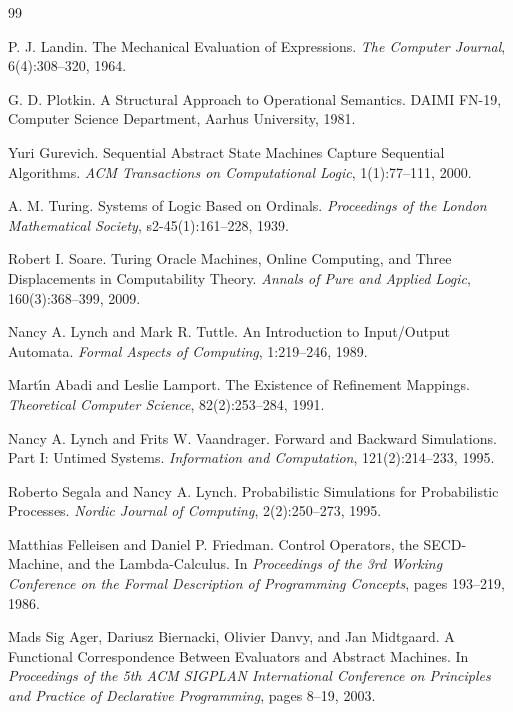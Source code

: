 \documentclass[11pt]{article}
\begin{document}
\begin{thebibliography}{99}


P. J. Landin.
\newblock The Mechanical Evaluation of Expressions.
\newblock \emph{The Computer Journal}, 6(4):308--320, 1964.

G. D. Plotkin.
\newblock A Structural Approach to Operational Semantics.
\newblock DAIMI FN-19, Computer Science Department, Aarhus University, 1981.

Yuri Gurevich.
\newblock Sequential Abstract State Machines Capture Sequential Algorithms.
\newblock \emph{ACM Transactions on Computational Logic}, 1(1):77--111, 2000.

A. M. Turing.
\newblock Systems of Logic Based on Ordinals.
\newblock \emph{Proceedings of the London Mathematical Society}, s2-45(1):161--228, 1939.

Robert I. Soare.
\newblock Turing Oracle Machines, Online Computing, and Three Displacements in Computability Theory.
\newblock \emph{Annals of Pure and Applied Logic}, 160(3):368--399, 2009.

Nancy A. Lynch and Mark R. Tuttle.
\newblock An Introduction to Input/Output Automata.
\newblock \emph{Formal Aspects of Computing}, 1:219--246, 1989.

Mart\'\i n Abadi and Leslie Lamport.
\newblock The Existence of Refinement Mappings.
\newblock \emph{Theoretical Computer Science}, 82(2):253--284, 1991.

Nancy A. Lynch and Frits W. Vaandrager.
\newblock Forward and Backward Simulations. Part I: Untimed Systems.
\newblock \emph{Information and Computation}, 121(2):214--233, 1995.

Roberto Segala and Nancy A. Lynch.
\newblock Probabilistic Simulations for Probabilistic Processes.
\newblock \emph{Nordic Journal of Computing}, 2(2):250--273, 1995.

Matthias Felleisen and Daniel P. Friedman.
\newblock Control Operators, the SECD-Machine, and the Lambda-Calculus.
\newblock In \emph{Proceedings of the 3rd Working Conference on the Formal Description of Programming Concepts}, pages 193--219, 1986.

Mads Sig Ager, Dariusz Biernacki, Olivier Danvy, and Jan Midtgaard.
\newblock A Functional Correspondence Between Evaluators and Abstract Machines.
\newblock In \emph{Proceedings of the 5th ACM SIGPLAN International Conference on Principles and Practice of Declarative Programming}, pages 8--19, 2003.


\end{thebibliography}
\end{document}
